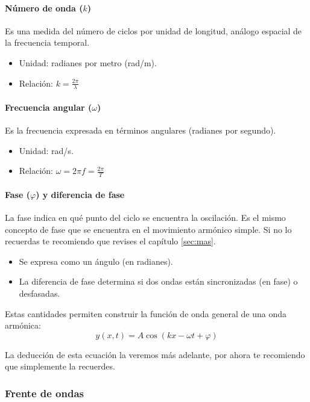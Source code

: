 \paragraph{Número de onda (\(k\))}

Es una medida del número de ciclos por unidad de longitud, análogo espacial de la frecuencia temporal.

\begin{itemize}
  \item Unidad: radianes por metro (rad/m).
  \item Relación: \(k = \frac{2\pi}{\lambda}\)
\end{itemize}

\paragraph{Frecuencia angular (\(\omega\))}

Es la frecuencia expresada en términos angulares (radianes por segundo).

\begin{itemize}
  \item Unidad: rad/s.
  \item Relación: \(\omega = 2\pi f = \frac{2\pi}{T}\)
\end{itemize}

\paragraph{Fase (\(\varphi\)) y diferencia de fase}

La fase indica en qué punto del ciclo se encuentra la oscilación. Es el mismo concepto de fase que se encuentra en el movimiento armónico simple. Si no lo recuerdas te recomiendo que revises el capítulo \ref{sec:mas}.

\begin{itemize}
  \item Se expresa como un ángulo (en radianes).
  \item La diferencia de fase determina si dos ondas están sincronizadas (en fase) o desfasadas.
\end{itemize}

Estas cantidades permiten construir la función de onda general de una onda armónica:
\[
y(x, t) = A \cos(kx - \omega t + \varphi)
\]

La deducción de esta ecuación la veremos más adelante, por ahora te recomiendo que simplemente la recuerdes.

\subsubsection{Frente de ondas}

